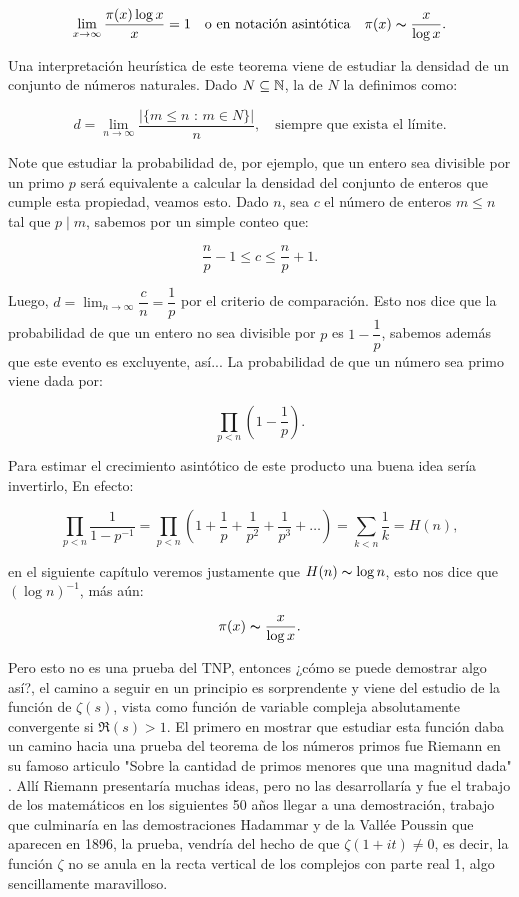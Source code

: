$$\lim_{x \to \infty}\dfrac{\pi(x)\log x}{x}=1 \quad \text{o en notación asintótica} \quad \pi(x)\thicksim \dfrac{x}{\log x}.$$

Una interpretación heurística de este teorema viene de estudiar la densidad de un conjunto de números naturales. Dado $N\subseteq \mathbb{N}$, la  de $N$ la definimos como:

$$d=\lim_{n\to \infty}\frac{|\{m\leq n \text{ : }m\in N\}|}{n}, \quad \text{siempre que exista el límite}.$$

Note que estudiar la probabilidad de, por ejemplo, que un entero sea divisible por un primo $p$ será equivalente a calcular la densidad del conjunto de enteros que cumple esta propiedad, veamos esto. Dado $n$, sea  $c$ el número de enteros $m\leq n$ tal que $p\mid m$, sabemos por un simple conteo que:

$$\frac{n}{p}-1\leq c\leq\frac{n}{p}+1.$$

Luego, $d=\displaystyle\lim_{n \to \infty}\dfrac{c}{n}=\dfrac{1}{p}$ por el criterio de comparación. Esto nos dice que la probabilidad de que un entero no sea divisible por $p$ es $1-\dfrac{1}{p}$, sabemos además que este evento es excluyente, así... La probabilidad de que un número sea primo viene dada por:

$$\displaystyle\prod_{p<n}\left( 1-\frac{1}{p} \right).$$

Para estimar el crecimiento asintótico de este producto una buena idea sería invertirlo, En efecto:

$$\prod_{p<n} \dfrac{1}{1-p^{-1}}=\prod_{p<n} \left(1+\dfrac{1}{p}+\dfrac{1}{p^2}+\dfrac{1}{p^3}+\ldots\right)=\sum_{k<n}\frac{1}{k}=H(n),$$

en el siguiente capítulo veremos justamente que $H(n)\thicksim \log n$, esto nos dice que  $(\log n)^{-1}$, más aún:

$$\pi(x)\thicksim \dfrac{x}{\log x}.$$

Pero esto no es una prueba del TNP, entonces ¿cómo se puede demostrar algo así?, el camino a seguir en un principio es sorprendente y viene del estudio de la función de $\zeta(s)$, vista como función de variable compleja absolutamente convergente si $\Re(s)>1$. El primero en mostrar que estudiar esta función daba un camino hacia una prueba del teorema de los números primos fue Riemann en su famoso articulo "Sobre la cantidad de primos menores que una magnitud dada"  \cite{riemann1990ueber}. Allí Riemann presentaría muchas ideas, pero no las desarrollaría y fue el trabajo de los matemáticos en los siguientes 50 años llegar a una demostración, trabajo que culminaría en las demostraciones Hadammar y de la Vallée Poussin que aparecen en 1896, la prueba, vendría del hecho de que $\zeta(1+it)\neq 0$, es decir, la función $\zeta$ no se anula en la recta vertical de los complejos con parte real 1, algo sencillamente maravilloso.\\

